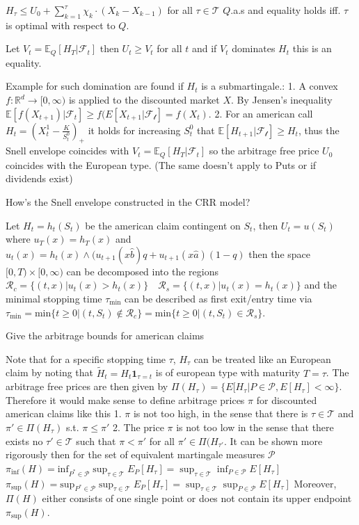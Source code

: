 \( H_\tau \leq U_0 + \sum_{k=1}^\tau \chi_k \cdot (X_k - X_{k-1}) \) for all \( \tau \in \mathcal{T} \) \( Q \).a.s
and equality holds iff. \( \tau \) is optimal with respect to \( Q \).

Let \( V_t = \mathbb{E}_Q[H_T|\mathcal{F}_t] \) then \( U_t \geq V_t \) for all \( t \) and if \( V_t \)
dominates \( H_t \) this is an equality.

Example for such domination are found if \( H_t \) is a submartingale.:
1. A convex \( f : \mathbb{R}^d \to [0, \infty) \) is applied 
to the discounted market \( X \). By Jensen's inequality
\( \mathbb{E}[f(X_{t+1})|\mathcal{F}_t] \geq f(E[X_{t+1}|\mathcal{F_t}] = f(X_t) \).
2. For an american call \( H_t = (X^1_t - \frac{K}{S^0_t})_{+} \) it holds for increasing \( S^0_t \) that
\( \mathbb{E}[H_{t+1}|\mathcal{F_t}] \geq H_t \), thus the Snell envelope coincides with \( V_t = \mathbb{E}_Q[H_T|\mathcal{F}_t] \)
so the arbitrage free price \( U_0 \) coincides with the European type. (The same doesn't apply to Puts or if dividends exist)


How's the Snell envelope constructed in the CRR model?

Let \( H_t = h_t(S_t) \) be the american claim contingent on \( S_t \), then
\( U_t = u(S_t) \) where
\( u_T(x) = h_T(x) \) and \( u_t(x) = h_t(x) \wedge (u_{t+1}(x\hat{b})q + u_{t+1}(x\hat{a})(1 - q) \)
then the space \( [0, T) \times [0, \infty) \) can be decomposed into the regions
\( \mathcal{R}_c = \{ (t, x) | u_t(x) > h_t(x) \} \quad \mathcal{R}_s = \{ (t, x) | u_t(x) = h_t(x) \} \)
and the minimal stopping time \( \tau_\text{min} \) can be described as first exit/entry time via 
\( \tau_\text{min} = \text{min} \{t \geq 0| (t, S_t) \nin \mathcal{R}_c \} = \text{min} \{t \geq 0 | (t, S_t) \in \mathcal{R}_s \} \).


Give the arbitrage bounds for american claims

Note that for a specific stopping time \( \tau \), \( H_\tau \) can be treated like an European claim
by noting that \( \tilde{H}_t = H_t \mathbf{1}_{\tau = t} \) is of european type with maturity \( T = \tau \).
The arbitrage free prices are then given by
\( \Pi(H_\tau) = \{ E[H_\tau|P \in \mathcal{P}, E[H_\tau] < \infty \} \).
Therefore it would make sense to define arbitrage prices \( \pi \) for discounted american claims like this
1. \( \pi \) is not too high, in the sense that there is \( \tau \in \mathcal{T} \) and \( \pi' \in \Pi(H_\tau) \) s.t. \( \pi \leq \pi' \)
2. The price \( \pi \) is not too low in the sense that there exists no \( \tau' \in \mathcal{T} \) such that \( \pi < \pi' \)
for all \( \pi' \in \Pi(H_{\tau'} \).
It can be shown more rigorously then for the set of equivalent martingale measures \( \mathcal{P} \)
\( \pi_{\text{inf}}(H) = \text{inf}_{P^\ast \in \mathcal{P}} \sup_{\tau \in \mathcal{T}} E_P[H_\tau] = \sup_{\tau \in \mathcal{T}} \inf_{P \in \mathcal{P}} E[H_\tau] \)
\( \pi_{\text{sup}}(H) = \text{sup}_{P^\ast \in \mathcal{P}} \sup_{\tau \in \mathcal{T}} E_P[H_\tau] = \sup_{\tau \in \mathcal{T}} \sup_{P \in \mathcal{P}} E[H_\tau] \)
Moreover, \( \Pi(H) \) either consists of one single point or does not contain its upper endpoint \( \pi_{\text{sup}}(H) \).


